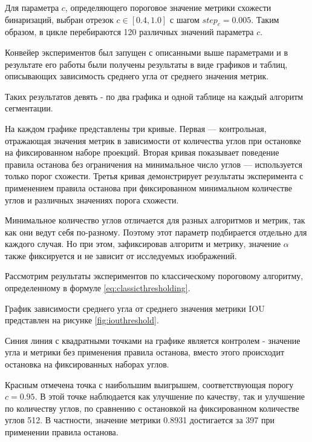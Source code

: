 Для параметра \(c\), определяющего пороговое значение метрики схожести бинаризаций, выбран отрезок \(c \in [0.4, 1.0]\) с шагом \(step_c = 0.005\). Таким образом, в цикле перебираются 120 различных значений параметра \(c\).

Конвейер экспериментов был запущен с описанными выше параметрами и в результате его работы были получены результаты в виде графиков и таблиц, описывающих зависимость среднего угла от среднего значения метрик. 

Таких результатов девять - по  два графика и одной таблице на каждый алгоритм сегментации.

На каждом графике представлены три кривые. Первая — контрольная, отражающая значения метрик в зависимости от количества углов при остановке на фиксированном наборе проекций. Вторая кривая показывает поведение правила останова без ограничения на минимальное число углов — используется только порог схожести. Третья кривая демонстрирует результаты эксперимента с применением правила останова при фиксированном минимальном количестве углов и различных значениях порога схожести.

Минимальное количество углов отличается для разных алгоритмов и метрик, так как они ведут себя по-разному. Поэтому этот параметр подбирается отдельно для каждого случая. Но при этом, зафиксировав алгоритм и метрику, значение \(\alpha\) также фиксируется и не зависит от исследуемых изображений.


Рассмотрим результаты экспериментов по классическому пороговому алгоритму, определенному в формуле \ref*{eq:classicthresholding}.

График зависимости среднего угла от среднего значения метрики IOU представлен на рисунке \ref*{fig:iouthreshold}.


Синия линия с квадратными точками на графике является контролем - значение угла и метрики без применения правила останова, вместо этого происходит остановка на фиксированных наборах углов.

Красным отмечена точка с наибольшим выигрышем, соответствующая порогу \(c = 0.95\). В этой точке наблюдается как улучшение по качеству, так и улучшение по количеству углов, по сравнению с остановкой на фиксированном количестве углов 512. В частности, значение метрики 0.8931 достигается за 397 при применении правила останова.

